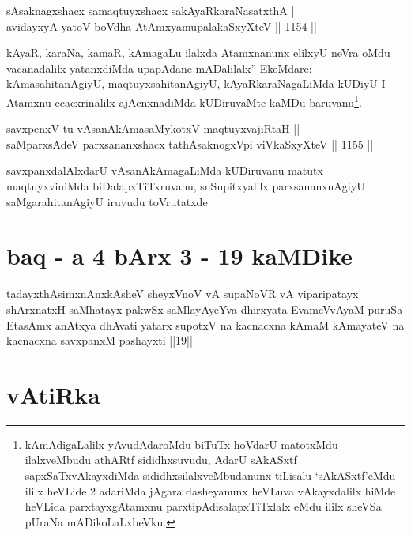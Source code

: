 \begin{shl}
sAsaknagxshacx samaqtuyxshacx sakAyaRkaraNasatxthA || \\
avidayxyA yatoV boVdha AtAmx\s yamupalakaSxyXteV \hfill || 1154 ||  
\end{shl}

\begin{artha}
kAyaR, karaNa, kamaR, kAmagaLu ilalxda Atamxnanunx elilxyU neVra oMdu vacanadalilx yatanxdiMda upapAdane mADalilalx'' EkeMdare:- kAmasahitanAgiyU, maqtuyxsahitanAgiyU, kAyaRkaraNagaLiMda kUDiyU I Atamxnu ecacxrinalilx ajAcnxnadiMda kUDiruvaMte kaMDu baruvanu\footnote{kAmAdigaLalilx yAvudAdaroMdu biTuTx hoVdarU matotxMdu ilalxveMbudu athARtf sididhxsuvudu, AdarU sAkASxtf sapxSaTxvAkayxdiMda sididhxsilalxveMbudanunx tiLisalu `sAkASxtf'eMdu ililx heVLide 2 adariMda jAgara dasheyanunx heVLuva vAkayxdalilx hiMde heVLida parxtayxgAtamxnu parxtipAdisalapxTiTxlalx eMdu ililx sheVSa pUraNa mADikoLaLxbeVku.}.
\end{artha}


\begin{shl}
savxpenxV tu vAsanAkAmasaMykotxV maqtuyxvajiRtaH || \\
saMparxsAdeV parxsananxshacx tathA\s saknogxV\s pi viVkaSxyXteV \hfill || 1155 ||  
\end{shl}

\begin{artha}
savxpanxdalAlxdarU vAsanAkAmagaLiMda kUDiruvanu matutx maqtuyxviniMda biDalapxTiTxruvanu, suSupitxyalilx parxsananxnAgiyU saMgarahitanAgiyU iruvudu toVrutatxde
\end{artha}

\section*{baq - a 4 bArx 3 - 19 kaMDike}

\begin{shl}
tadayxthAsimxnAnxkAsheV sheyxVnoV vA supaNoVR vA viparipatayx shArxnatxH saMhatayx pakwSx saMlayAyeYva dhirxyata EvameVvAyaM puruSa EtasAmx anAtxya dhAvati yatarx supotxV na kacnacxna kAmaM kAmayateV na kacnacxna savxpanxM pashayxti ||19||
\end{shl}

\section*{vAtiRka}


